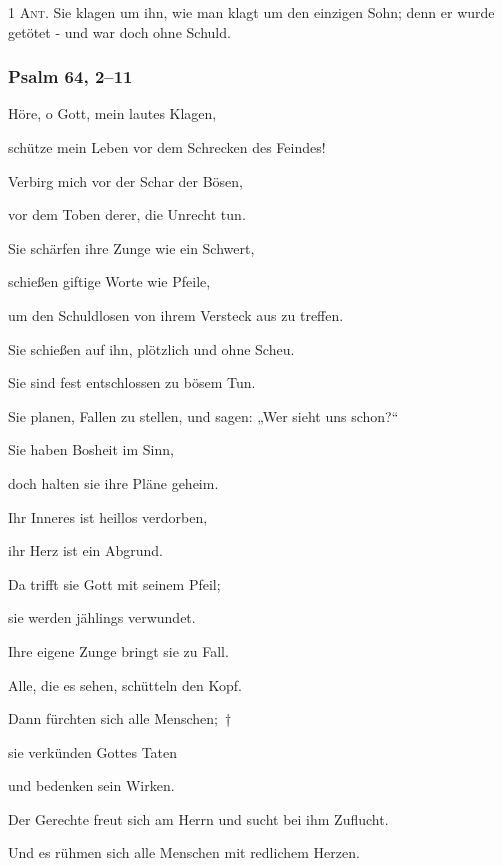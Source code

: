 \noindent \textsc{1 Ant.} Sie klagen um ihn, wie man klagt um den einzigen Sohn; denn er wurde getötet - und war doch ohne Schuld.

\subsubsection{Psalm 64, 2--11}

\noindent Höre, o Gott, mein lautes Klagen,~\GreStar{}~\nopagebreak

schütze mein Leben vor dem Schrecken des Feindes!

\noindent Verbirg mich vor der Schar der Bösen,~\GreStar{}~\nopagebreak

vor dem Toben derer, die Unrecht tun.

\noindent Sie schärfen ihre Zunge wie ein Schwert,~\GreStar{}~\nopagebreak

schießen giftige Worte wie Pfeile,

\noindent um den Schuldlosen von ihrem Versteck aus zu treffen.~\GreStar{}~\nopagebreak

Sie schießen auf ihn, plötzlich und ohne Scheu.

\noindent Sie sind fest entschlossen zu bösem Tun.~\GreStar{}~\nopagebreak

Sie planen, Fallen zu stellen, und sagen: „Wer sieht uns schon?“

\noindent Sie haben Bosheit im Sinn,~\GreStar{}~\nopagebreak

doch halten sie ihre Pläne geheim. 

\noindent Ihr Inneres ist heillos verdorben,~\GreStar{}~\nopagebreak

ihr Herz ist ein Abgrund.

\noindent Da trifft sie Gott mit seinem Pfeil;~\GreStar{}~\nopagebreak

sie werden jählings verwundet.

\noindent Ihre eigene Zunge bringt sie zu Fall.~\GreStar{}~\nopagebreak

Alle, die es sehen, schütteln den Kopf.

\noindent Dann fürchten sich alle Menschen;~†~\nopagebreak

sie verkünden Gottes Taten~\GreStar{}~\nopagebreak

und bedenken sein Wirken.

\noindent Der Gerechte freut sich am Herrn und sucht bei ihm Zuflucht.~\GreStar{}~\nopagebreak

Und es rühmen sich alle Menschen mit redlichem Herzen.


